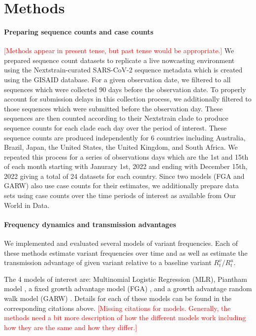 \documentclass[11pt,oneside,letterpaper]{article}
\def\jhc#1{\textcolor{red}{[#1]}}
\begin{document}
\section*{Methods}

\paragraph{Preparing sequence counts and case counts}

\jhc{Methods appear in present tense, but past tense would be appropriate.}
We prepared sequence count datasets to replicate a live nowcasting environment using the Nextstrain-curated SARS-CoV-2 sequence metadata which is created using the GISAID database.
For a given observation date, we filtered to all sequences which were collected 90 days before the observation date.
To properly account for submission delays in this collection process, we additionally filtered to those sequences which were submitted before the observation day.
These sequences are then counted according to their Nextstrain clade to produce sequence counts for each clade each day over the period of interest.
These sequence counts are produced independently for 6 countries including Australia, Brazil, Japan, the United States, the United Kingdom, and South Africa.
We repeated this process for a series of observations days which are the 1st and 15th of each month starting with  Janurary 1st, 2022 and ending with December 15th, 2022 giving a total of 24 datasets for each country.
Since two models (FGA and GARW) also use case counts for their estimates, we additionally prepare data sets using case counts over the time periods of interest as available from Our World in Data.

\paragraph{Frequency dynamics and transmission advantages}%

We implemented and evaluated several models of variant frequencies.
Each of these methods estimate variant frequencies over time and as well as estimate the transmission advantage of given variant relative to a baseline variant $R_{t}^{v} / R_{t}^{u}$.

The 4 models of interest are: Multinomial Logistic Regression (MLR), Piantham model \cite{piantham2021estimating}, a fixed growth advantage model (FGA)  \cite{figgins2022sars}, and a growth advantage random walk model (GARW)  \cite{figgins2022sars}.
Details for each of these models can be found in the corresponding citations above.
\jhc{Missing citations for models. Generally, the methods need a bit more description of how the different models work including how they are the same and how they differ.}
\end{document}
